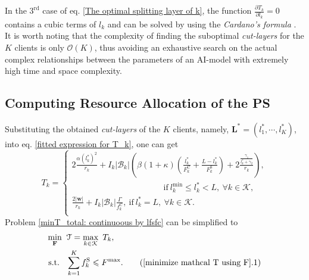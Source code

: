 \documentclass[10pt,journal,transmag]{IEEEtran}
\begin{document}
In the $3^\text{rd}$ case of eq. \eqref{The optimal splitting layer of k}, the function $\frac{\partial T_k}{\partial l_k}=0$ contains a cubic terms of $l_k$ and can be solved by using the \textit{Cardano’s formula} \cite{9408263}. It is worth noting that the complexity of finding the suboptimal \textit{cut-layers} for the $K$ clients is only $\mathcal{O}(K)$, thus avoiding an exhaustive search on the actual complex relationships between the parameters of an AI-model with extremely high time and space complexity.


\subsection{Computing Resource Allocation of the PS}
Substituting the obtained \textit{cut-layers} of the $K$ clients, namely, $\textbf{L}^*=(l_1^*, \cdots, l_K^*)$, into eq. \eqref{fitted expression for T_k}, one can get
\begin{equation}
     T_k =  
    \begin{cases} 
        2\frac{\alpha (l_k^*)^2}{r_k} + I_k \left|\mathcal{B}_k\right| \left( \beta(1+\kappa)\left(\frac{ l_k^* }{F_k^\text{C}}+ \frac{  L - l_k^*  }{F_k^\text{S}} \right) + 2\frac{\frac{\gamma_1}{l_k^*+\gamma_2}}{r_k} \right), \\ 
        \quad \quad \quad \quad \quad \quad \quad \quad \quad \quad\quad \text{if}\ l_k^\text{min} \leqslant l_k^* < L,\ \forall k \in \mathcal{K},\   \\
        \displaystyle {\frac{2|\textbf{w}|}{r_k}+ I_k |\mathcal{B}_k| \frac{\Gamma}{f^\text{C}_k}},\ \text{if}\ l_k^*=L,\ \forall k \in \mathcal{K}.\\
    \end{cases} 
\end{equation}
Problem \eqref{minT_total: continuoous by lfsfc} can be simplified to 
\begin{alignat}{1}
    \min_{\textbf{F}} \;\; & \mathcal{T}=\max_{k\in\mathcal{K}}\ T_k, \label{minimize mathcal T using F} \\
    \mbox{s.t.}\;\;\; 
    & \sum^{K}_{k=1} f^\text{S}_k \leqslant F^{\text{max}}. \tag{\ref{minimize mathcal T using F}.1} \label{minimize mathcal T using F:sum of PS frequency}    
\end{alignat}
\end{document}
